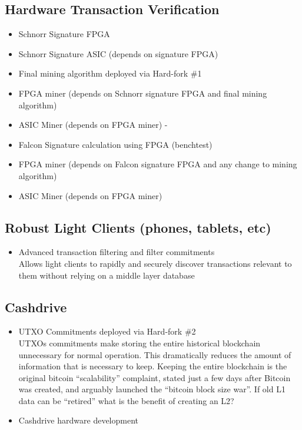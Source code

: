 \documentclass[a4paper, 11pt]{article}
\begin{document}
\subsection{Hardware Transaction Verification}
\begin{itemize}
    \item Schnorr Signature FPGA
    \item Schnorr Signature ASIC (depends on signature FPGA)
    \item Final mining algorithm deployed via Hard-fork \#1
    \item FPGA miner (depends on Schnorr signature FPGA and final mining algorithm)
    \item ASIC Miner (depends on FPGA miner) -
    \item Falcon Signature calculation using FPGA (benchtest)
    \item FPGA miner (depends on Falcon signature FPGA and any change to mining algorithm)
    \item ASIC Miner (depends on FPGA miner)
\end{itemize}

\subsection{Robust Light Clients (phones, tablets, etc)}
\begin{itemize}
    \item Advanced transaction filtering and filter commitments\\
		Allows light clients to rapidly and securely discover transactions relevant to them without relying on a middle layer database
\end{itemize}

\subsection{Cashdrive}
\begin{itemize}
    \item UTXO Commitments deployed via Hard-fork \#2\\
        UTXOs commitments make storing the entire historical blockchain unnecessary for normal operation.  This dramatically reduces the amount of information that is necessary to keep.  Keeping the entire blockchain is the original bitcoin “scalability” complaint, stated just a few days after Bitcoin was created, and arguably launched the “bitcoin block size war”.  If old L1 data can be “retired” what is the benefit of creating an L2?
    \item Cashdrive hardware development
\end{itemize}
\end{document}
